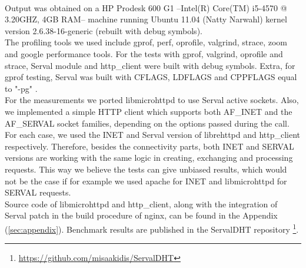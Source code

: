 \paragraph{} Output was obtained on a HP Prodesk 600 G1 --Intel(R) Core(TM) i5-4570 @ 3.20GHZ, 4GB RAM-- machine running Ubuntu 11.04 (Natty Narwahl) kernel version 2.6.38-16-generic (rebuilt with debug symbols).
\\ \indent The profiling tools we used include gprof, perf, oprofile, valgrind, strace, zoom and google performance tools.
For the tests with gprof, valgrind, oprofile and strace, Serval module and http\_client were built with debug symbols.
Extra, for gprof testing, Serval was built with CFLAGS, LDFLAGS and CPPFLAGS equal to "-pg" .
\\ \indent For the measurements we ported libmicrohttpd to use Serval active sockets.
Also, we implemented a simple HTTP client which supports both AF\_INET and the AF\_SERVAL socket families, depending on the options passed during the call.
For each case, we used the INET and Serval version of librehttpd and http\_client respectively.
Therefore, besides the connectivity parts, both INET and SERVAL versions are working with the same logic in creating, exchanging and processing requests.
This way we believe the tests can give unbiased results, which would not be the case if for example we used apache for INET and libmicrohttpd for SERVAL requests.
\\ \indent Source code of libmicrohttpd and http\_client, along with the integration of Serval patch in the build procedure of nginx, can be found in the Appendix (\ref{sec:appendix}).
Benchmark results are published in the ServalDHT repository \footnote{\url{https://github.com/misaakidis/ServalDHT}}.

